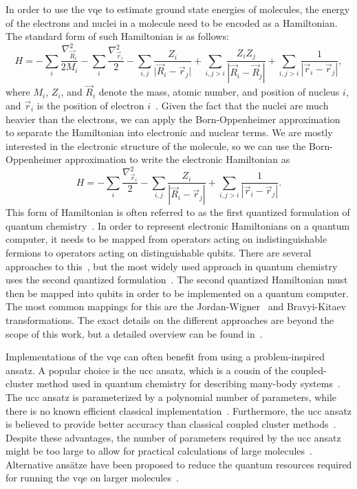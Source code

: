 In order to use the \gls{vqe} to estimate ground state energies of molecules, the energy of the electrons and nuclei in a molecule need to be encoded as a Hamiltonian.
The standard form of such Hamiltonian is as follows:
\begin{equation}
H = - \sum_i \frac{\nabla_{\vec{R}_i}^2}{2M_i}
    - \sum_i \frac{\nabla_{\vec{r}_i}^2}{2}
    - \sum_{i,j} \frac{Z_i}{\lvert\vec{R}_i - \vec{r}_j\rvert}
    + \sum_{i,j>i} \frac{Z_iZ_j}{|\vec{R}_i - \vec{R}_j|}
    + \sum_{i,j>i} \frac{1}{|\vec{r}_i - \vec{r}_j|},
\end{equation}
where $M_i$, $Z_i$, and $\vec{R}_i$ denote the mass, atomic number, and position of nucleus $i$, and $\vec{r}_i$ is the position of electron $i$~\cite{mcardle2018quantum}.
Given the fact that the nuclei are much heavier than the electrons, we can apply the Born-Oppenheimer approximation~\cite{born1927quantentheorie} to separate the Hamiltonian into electronic and nuclear terms.
We are mostly interested in the electronic structure of the molecule, so we can use the Born-Oppenheimer approximation to write the electronic Hamiltonian as
\begin{equation} 
H = - \sum_i \frac{\nabla_{\vec{r}_i}^2}{2}
- \sum_{i,j} \frac{Z_i}{|\vec{R}_i - \vec{r}_j|}
+ \sum_{i,j>i} \frac{1}{|\vec{r}_i - \vec{r}_j|}.
\end{equation}
This form of Hamiltonian is often referred to as the first quantized formulation of quantum chemistry~\cite[Appendix A]{o2016scalable}.
In order to represent electronic Hamiltonians on a quantum computer, it needs to be mapped from operators acting on indistinguishable fermions to operators acting on distinguishable qubits.
There are several approaches to this~\cite{kassal2011simulating}, but the most widely used approach in quantum chemistry uses the second quantized formulation~\cite{mcardle2018quantum}.
The second quantized Hamiltonian must then be mapped into qubits in order to be implemented on a quantum computer.
The most common mappings for this are the Jordan-Wigner~\cite{somma2002simulating} and Bravyi-Kitaev~\cite{seeley2012bravyi} transformations.
The exact details on the different approaches are beyond the scope of this work, but a detailed overview can be found in~\cite{mcardle2018quantum}.

Implementations of the \gls{vqe} can often benefit from using a problem-inspired ansatz.
A popular choice is the \gls{ucc} ansatz, which is a cousin of the coupled-cluster method used in quantum chemistry for describing many-body systems~\cite{shavitt2009many}.
The \gls{ucc} ansatz is parameterized by a polynomial number of parameters, while there is no known efficient classical implementation~\cite{taube2006new}.
Furthermore, the \gls{ucc} ansatz is believed to provide better accuracy than classical coupled cluster methods~\cite{cooper2010benchmark, evangelista2011alternative}.
Despite these advantages, the number of parameters required by the \gls{ucc} ansatz might be too large to allow for practical calculations of large molecules~\cite{wecker2015progress}.
Alternative ans{\"a}tze have been proposed to reduce the quantum resources required for running the \gls{vqe} on larger molecules~\cite{romero2018strategies, kandala2017hardware, grimsley2019adaptive}.

